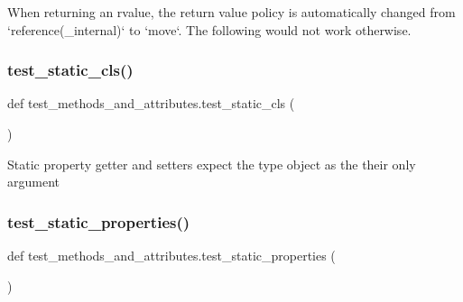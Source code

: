 \begin{DoxyVerb}When returning an rvalue, the return value policy is automatically changed from
`reference(_internal)` to `move`. The following would not work otherwise.\end{DoxyVerb}
 \mbox{\label{namespacetest__methods__and__attributes_a73e2f8813e4d8a3f04ae6cbaa0e94f59}} 
\subsubsection{\texorpdfstring{test\_static\_cls()}{test\_static\_cls()}}
{\footnotesize\ttfamily def test\+\_\+methods\+\_\+and\+\_\+attributes.\+test\+\_\+static\+\_\+cls (\begin{DoxyParamCaption}{ }\end{DoxyParamCaption})}

\begin{DoxyVerb}Static property getter and setters expect the type object as the their only argument\end{DoxyVerb}
 \mbox{\label{namespacetest__methods__and__attributes_a7631bd9712b84ef7b6bb9515fa3805ff}} 
\subsubsection{\texorpdfstring{test\_static\_properties()}{test\_static\_properties()}}
{\footnotesize\ttfamily def test\+\_\+methods\+\_\+and\+\_\+attributes.\+test\+\_\+static\+\_\+properties (\begin{DoxyParamCaption}{ }\end{DoxyParamCaption})}

\mbox{\label{namespacetest__methods__and__attributes_ac48f262bd9454cebbab3663a10949873}} 
